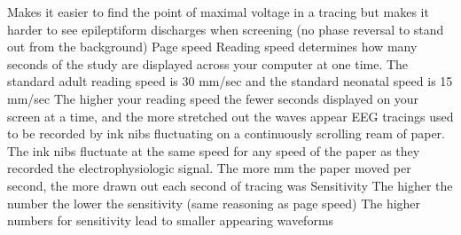 \documentclass[12pt]{article}
\begin{document}
Makes it easier to find the point of maximal voltage in a tracing but makes it harder to see epileptiform discharges when screening (no phase reversal to stand out from the background)
Page speed
Reading speed determines how many seconds of the study are displayed across your computer at one time. 
The standard adult reading speed is 30 mm/sec and the standard neonatal speed is 15 mm/sec
The higher your reading speed the fewer seconds displayed on your screen at a time, and the more stretched out the waves appear
EEG tracings used to be recorded by ink nibs fluctuating on a continuously scrolling ream of paper. 
The ink nibs fluctuate at the same speed for any speed of the paper as they recorded the electrophysiologic signal.
The more mm the paper moved per second, the more drawn out each second of tracing was
Sensitivity 
The higher the number the lower the sensitivity (same reasoning as page speed)
The higher numbers for sensitivity lead to smaller appearing waveforms
\end{document}
